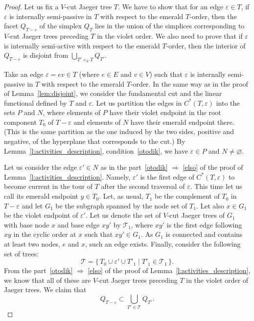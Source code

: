 \documentclass[10pt]{amsart}
\theoremstyle{definition}\newtheorem{defi}[theo]{Definition}
\theoremstyle{remark}\newtheorem{rema}[theo]{Remark}
\begin{document}
\begin{proof}
Let us fix a $V$-cut Jaeger tree $T$. We have to show that for an edge $\varepsilon\in T$, if $\varepsilon$ is internally semi-passive in $T$ with respect to the emerald $T$-order, then the facet $Q_{T-\varepsilon}$ of the simplex $Q_T$ lies in the union of the simplices corresponding to $V$-cut Jaeger trees preceding $T$ in the violet order. We also need to prove that if $\varepsilon$ is internally semi-active with respect to the emerald $T$-order, then the interior of $Q_{T-\varepsilon}$ is disjoint from $\bigcup_{T'<_V T}Q_{T'}$.

Take an edge $\varepsilon=ev \in T$ (where $e\in E$ and $v\in V$) such that $\varepsilon$ is internally semi-passive in $T$ with respect to the emerald $T$-order. In the same way as in the proof of Lemma~\ref{lem:disjoint}, we consider the fundamental cut and the linear functional defined by $T$ and $\varepsilon$. Let us partition the edges in $C^*(T,\varepsilon)$ into the sets $P$ and $N$, where elements of $P$ have their violet endpoint in the root component $T_0$ of $T-\varepsilon$ and elements of $N$ have their emerald endpoint there. (This is the same partition as the one induced by the two sides, positive and negative, of the hyperplane that corresponds to the cut.) By Lemma~\ref{l:activities_description}, condition~\ref{otodik}, we have $\varepsilon\in P$ and $N\neq \varnothing$. 

Let us consider the edge $\varepsilon'\in N$ as in the part~\ref{otodik} $\Rightarrow$ \ref{elso} of the proof of Lemma~\ref{l:activities_description}. Namely, $\varepsilon'$ is the first edge of $C^*(T,\varepsilon)$ to become current in the tour of $T$ after the second traversal of $\varepsilon$. This time let us call its emerald endpoint $y\in T_0$. Let, as usual, $T_1$ be the complement of $T_0$ in $T-\varepsilon$ and let $G_1$ be the subgraph spanned by the node set of $T_1$. Let also $x\in G_1$ be the violet endpoint of $\varepsilon'$. Let us denote the set of $V$-cut Jaeger trees of $G_1$ with base node $x$ and base edge $xy'$ by $\mathcal{T}_1$, where $xy'$ is the first edge following $xy$ in the cyclic order at $x$ such that $xy'\in G_1$. As $G_1$ is connected and contains at least two nodes, $e$ and $x$, such an edge exists. Finally, consider the following set of trees: 
\begin{equation}
\label{eq:sokfa}
\mathcal{T}=\{\,T_0\cup \varepsilon' \cup T'_1\mid T'_1 \in \mathcal{T}_1\,\}.
\end{equation}
From the part~\ref{otodik} $\Rightarrow$ \ref{elso} of the proof of Lemma~\ref{l:activities_description}, we know that all of these are $V$-cut Jaeger trees preceding $T$ in the violet order of Jaeger trees. We claim that 
\begin{equation*}
Q_{T-\varepsilon}\subset \bigcup_{T'\in \mathcal{T}}Q_{T'}.
\end{equation*}


\end{proof}
\end{document}
